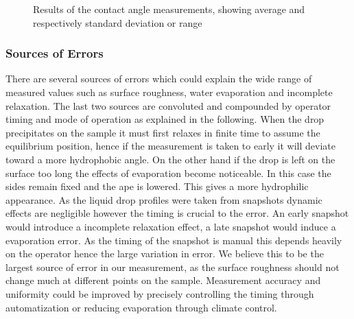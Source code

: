 \begin{figure}
\centering

\caption{Results of the contact angle measurements, showing average and  respectively standard deviation or range}
\label{fig:results}
\end{figure}



\subsubsection{Sources of Errors}

There are several sources of errors which could explain the wide range of measured values such as surface roughness, water evaporation and incomplete relaxation. The last two sources are convoluted and compounded by operator timing and mode of operation as explained in the following.
When the drop precipitates on the sample it must first relaxes in finite time to assume the equilibrium position, hence if the measurement is taken to early it will deviate toward a more hydrophobic angle.
On the other hand if the drop is left on the surface too long the effects of evaporation become noticeable. In this case the sides remain fixed and the ape is lowered. This gives a more hydrophilic appearance.
As the liquid drop profiles were taken from snapshots dynamic effects are negligible however the timing is crucial to the error. An early snapshot would introduce a incomplete relaxation effect, a late snapshot would induce a evaporation error. As the timing of the snapshot is manual this depends heavily on the operator hence the large variation in error.
We believe this to be the largest source of error in our measurement, as the surface roughness should not change much at different points on the sample. Measurement accuracy and uniformity could be improved by precisely controlling the timing through automatization or reducing evaporation through climate control.
